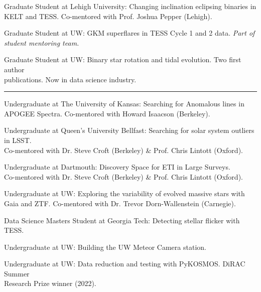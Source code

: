 Graduate Student at Lehigh University: Changing inclination eclipsing binaries in \\KELT and TESS. Co-mentored with Prof. Joshua Pepper (Lehigh).



Graduate Student at UW: GKM superflares in TESS Cycle 1 and 2 data. {\it Part of \\student mentoring team.}

Graduate Student at UW: Binary star rotation and tidal evolution. Two first author \\publications. Now in data science industry.



\rule{2in}{0.5pt} %

Undergraduate at The University of Kansas: Searching for Anomalous lines in\\ APOGEE Spectra. Co-mentored with Howard Isaacson (Berkeley).



Undergraduate at Queen's University Bellfast: Searching for solar system outliers in LSST.\\ Co-mentored with Dr. Steve Croft (Berkeley) \& Prof. Chris Lintott (Oxford).

Undergraduate at Dartmouth: Discovery Space for ETI in Large Surveys.\\ Co-mentored with Dr. Steve Croft (Berkeley) \& Prof. Chris Lintott (Oxford).


Undergraduate at UW: Exploring the variability of evolved massive stars with \\Gaia and ZTF. Co-mentored with Dr. Trevor Dorn-Wallenstein (Carnegie).



Data Science Masters Student at Georgia Tech: Detecting stellar flicker with TESS.

Undergraduate at UW: Building the UW Meteor Camera station.

Undergraduate at UW: Data reduction and testing with PyKOSMOS. DiRAC Summer \\Research Prize winner (2022).

